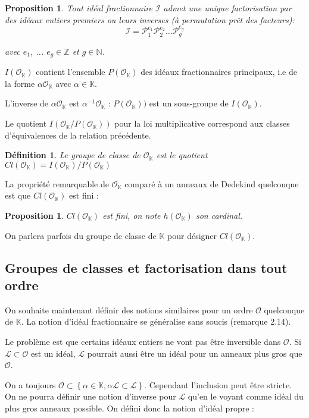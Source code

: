\documentclass{article}
\newcommand{\N}[0]{\mathbb{N}}
\newcommand{\Z}[0]{\mathbb{Z}}
\newcommand{\K}[0]{\mathbb{K}}
\newcommand{\OR}[0]{\mathcal{O}}
\newcommand{\LR}[0]{\mathcal{L}}
\newcommand{\PR}[0]{\mathcal{P}}
\newcommand{\IR}[0]{\mathcal{I}}
\newtheorem{Prop}[The]{Proposition}
\newtheorem{Def}[The]{Définition}
\begin{document}
\begin{Prop}
	Tout idéal fractionnaire $\IR$ admet une unique factorisation par des idéaux entiers premiers ou leurs inverses (à permutation prêt des facteurs):
	\begin{equation*}
		\IR = \PR_{1}^{e_{1}}\PR_{2}^{e_{2}}\ldots\PR_{g}^{e_{g}}
	\end{equation*}
	
	avec $e_{1}$, ... $e_{g}\in\Z$ et $g\in\N$.
	
\end{Prop}

$I(\OR_{\K})$ contient l'ensemble $P(\OR_{\K})$ des idéaux fractionnaires principaux, i.e de la forme $\alpha\OR_{\K}$ avec $\alpha\in\K$. 

L'inverse de $\alpha\OR_{\K}$ est $\alpha^{-1}\OR_{\K}$ : $P(\OR_{\K}))$ est un sous-groupe de $I(\OR_{\K})$.

Le quotient $I(\OR_{\K}/P(\OR_{\K}))$ pour la loi multiplicative correspond aux classes d'équivalences de la relation précédente.

\begin{Def}
	Le groupe de classe de $\OR_{\K}$ est le quotient $Cl(\OR_{\K}) =  I(\OR_{\K})/P(\OR_{\K})$
\end{Def}

La propriété remarquable de $\OR_{\K}$ comparé à un anneaux de Dedekind quelconque est que $Cl(\OR_{\K})$ est fini :

\begin{Prop}
	$Cl(\OR_{\K})$ est fini, on note $h(\OR_{\K})$ son cardinal. 
\end{Prop} 

On parlera parfois du groupe de classe de $\K$ pour désigner $Cl(\OR_{\K})$.

\subsection{Groupes de classes et factorisation dans tout ordre}

On souhaite maintenant définir des notions similaires pour un ordre $\OR$ quelconque de $\K$. La notion d'idéal fractionnaire se généralise sans soucis (remarque 2.14).

Le problème est que certains idéaux entiers ne vont pas être inversible dans $\OR$. Si $\LR\subset\OR$ est un idéal, $\LR$ pourrait aussi être un idéal pour un anneaux plus gros que $\OR$. 

On a toujours $\OR\subset\left\lbrace \alpha\in\K, \alpha\LR\subset\LR\right\rbrace$. Cependant l'inclusion peut être stricte. On ne pourra définir une notion d'inverse pour $\LR$ qu'en le voyant comme idéal du plus gros anneaux possible. On défini donc la notion d'idéal propre :
\end{document}
